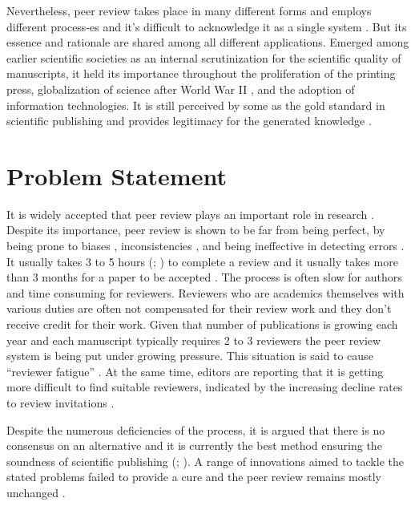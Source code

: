 Nevertheless, peer review takes place in many different forms and employs different process-es and it’s difficult to acknowledge it as a single system \parencite[2]{HorbachS.P.J.M..2017}. But its essence and rationale are shared among all different applications. Emerged among earlier scientific societies as an internal scrutinization for the scientific quality of manuscripts, it held its importance throughout the proliferation of the printing press, globalization of science after World War II \parencite{Fyfe.2017}, and the adoption of information technologies. It is still perceived by some as the gold standard in scientific publishing \parencite{Mayden.2012} and provides legitimacy for the generated knowledge \parencite{Tennant.2020c}.


\section{Problem Statement}

It is widely accepted that peer review plays an important role in research \parencite{Publons.2018, Taylor&Francis.2015, Ware.2008, Zuckerman.1971}. Despite its importance, peer review is shown to be far from being perfect, by being prone to biases \parencite{Lee.2013, Mahoney.1977}, inconsistencies \parencite{Peters.1982, Rothwell.2000}, and being ineffective in detecting errors \parencite{Schroter.2004}. It usually takes 3 to 5 hours (\cite[146]{Mulligan.2013}; \cite[42]{Ware.2008}) to complete a review and it usually takes more than 3 months for a paper to be accepted \parencite[51]{Ware.2008}. The process is often slow for authors and time consuming for reviewers. Reviewers who are academics themselves with various duties are often not compensated for their review work and they don’t receive credit for their work. Given that number of publications is growing each year \parencite{Bornmann.2015} and each manuscript typically requires 2 to 3 reviewers the peer review system is being put under growing pressure. This situation is said to cause “reviewer fatigue” \parencite{Breuning.2015}. At the same time, editors are reporting that it is getting more difficult to find suitable reviewers, indicated by the increasing decline rates to review invitations \parencite{Baveye.2011, Fox.2017}. 

Despite the numerous deficiencies of the process, it is argued that there is no consensus on an alternative \parencite{Smith.2006, Young.2003} and it is currently the best method ensuring the soundness of scientific publishing (\cite[5201]{Grainger.2007}; \cite[2]{HorbachS.P.J.M..2017}). A range of innovations aimed to tackle the stated problems failed to provide a cure and the peer review remains mostly unchanged \parencite{Tennant.2017}. 


